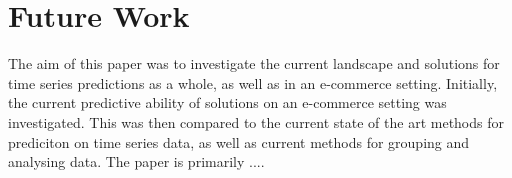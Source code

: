 
\section{Future Work}
\label{sections:Discussion:FutureWork}



% 

The aim of this paper was to investigate the current landscape and solutions for time series predictions as a whole,
as well as in an e-commerce setting.
Initially, the current predictive ability of solutions on an e-commerce setting was investigated.
This was then compared to the current state of the art methods for prediciton on time series data,
as well as current methods for grouping and analysing data.
The paper is primarily ....



\iffalse
Consider where you would like to extend this work. These extensions might either be continuing the ongoing direction or taking a side direction that became obvious during the work. Further, possible solutions to limitations in the work conducted, highlighted in ~\ref{sec:Discussion} may be presented. 
\fi

